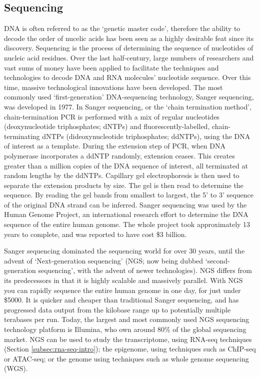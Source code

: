 \subsection{Sequencing}
DNA is often referred to as the `genetic master code', therefore the ability to decode the order of nucelic acids has been seen as a highly desirable feat since its discovery.
Sequencing is the process of determining the sequence of nucleotides of nucleic acid residues.
Over the last half-century, large numbers of researchers and vast sums of money have been applied to facilitate the techniques and technologies to decode DNA and RNA molecules' nucleotide sequence\cite{heather2016sequence}.
Over this time, massive technological innovations have been developed.
The most commonly used `first-generation' DNA-sequencing technology, Sanger sequencing, was developed in 1977\cite{sanger1977dna}.
In Sanger sequencing, or the `chain termination method', chain-termination PCR is performed with a mix of regular nucleotides (deoxynucleotide triphosphates; dNTPs) and fluorescently-labelled, chain-terminating dNTPs (dideoxynucleotide triphosphates; ddNTPs), using the DNA of interest as a template.
During the extension step of PCR, when DNA polymerase incorporates a ddNTP randomly, extension ceases.
This creates greater than a million copies of the DNA sequence of interest, all terminated at random lengths by the ddNTPs.
Capillary gel electrophoresis is then used to separate the extension products by size.
The gel is then read to determine the sequence.
By reading the gel bands from smallest to largest, the 5' to 3' sequence of the original DNA strand can be inferred.
Sanger sequencing was used by the Human Genome Project, an international research effort to determine the DNA sequence of the entire human genome\cite{pennisi2001human}.
The whole project took approximately 13 years to complete, and was reported to have cost \$3 billion.

Sanger sequencing dominated the sequencing world for over 30 years, until the advent of `Next-generation sequencing' (NGS; now being dubbed `second-generation sequencing', with the advent of newer technologies).
NGS differs from its predecessors in that it is highly scalable and massively parallel.
With NGS you can rapidly sequence the entire human genome in one day, for just under \$5000.
It is quicker and cheaper than traditional Sanger sequencing, and has progressed data output from the kilobase range up to potentially multiple terabases per run.
Today, the largest and most commonly used NGS sequencing technology platform is Illumina, who own around 80\% of the global sequencing market.
NGS can be used to study the transcriptome, using RNA-seq techniques (Section \ref{subsec:rna-seq-intro}); the epigenome, using techniques such as ChIP-seq or ATAC-seq; or the genome using techniques such as whole genome sequencing (WGS).

